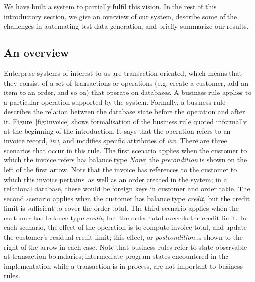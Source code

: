 We have built a system to partially fulfil this vision.  In the rest of this introductory section, we
give an overview of our system, describe some of the challenges in automating test data generation, and 
briefly summarize our results.


\subsection{An overview}

Enterprise systems of interest to us are transaction oriented, which means that they consist of a set of
transactions or operations (e.g. create a customer, add an item to an order, and so on) that operate on databases.  
A business rule applies to a particular operation supported by the system.  Formally, a business rule
describes the relation between the database state before the operation and after it.  Figure~\ref{fig:invoice} shows
formalization of the business rule quoted informally at the beginning of the introduction.  It says that
the operation refers to an invoice record, \textit{inv}, and modifies specific attributes of \textit{inv}.
There are three scenarios that occur in this rule.  The first scenario applies when the customer to which the
invoice refers has balance type \textit{None}; the \textit{precondition} is shown on the left of the first arrow.  
Note that the invoice has references to the customer to which this invoice pertains, 
as well as an order created in the system; in a relational database, these would be foreign keys in customer and 
order table.  The second scenario applies when the customer has balance type \textit{credit}, but the credit limit 
is sufficient to cover the order total.    The third scenario applies when the customer has balance type 
\textit{credit}, but the order total exceeds the credit limit.  In each scenario, the effect of the operation is to 
compute invoice total, and update the customer's residual credit limit; this effect, or \textit{postcondition} is 
shown to the right of the arrow in each case.  Note that business rules refer to state observable at transaction 
boundaries; intermediate program states encountered in the implementation while a transaction is in process, are 
not important to business rules.

